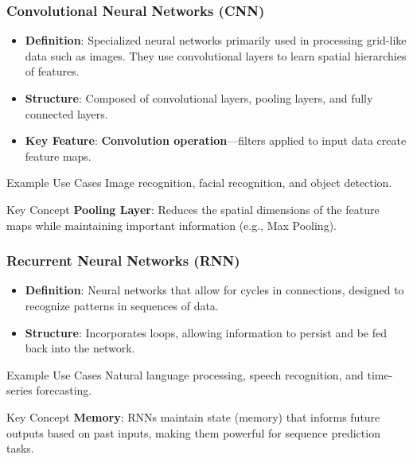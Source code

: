 \documentclass[aspectratio=169]{beamer}
\begin{document}
\begin{frame}[fragile]
    \frametitle{Convolutional Neural Networks (CNN)}
    \begin{itemize}
        \item \textbf{Definition}: Specialized neural networks primarily used in processing grid-like data such as images. They use convolutional layers to learn spatial hierarchies of features.
        \item \textbf{Structure}: Composed of convolutional layers, pooling layers, and fully connected layers.
        \item \textbf{Key Feature}: \textbf{Convolution operation}—filters applied to input data create feature maps.
    \end{itemize}

    \begin{block}{Example Use Cases}
        Image recognition, facial recognition, and object detection.
    \end{block}

    \begin{block}{Key Concept}
        \textbf{Pooling Layer}: Reduces the spatial dimensions of the feature maps while maintaining important information (e.g., Max Pooling).
    \end{block}

\end{frame}

\begin{frame}[fragile]
    \frametitle{Recurrent Neural Networks (RNN)}
    \begin{itemize}
        \item \textbf{Definition}: Neural networks that allow for cycles in connections, designed to recognize patterns in sequences of data.
        \item \textbf{Structure}: Incorporates loops, allowing information to persist and be fed back into the network.
    \end{itemize}

    \begin{block}{Example Use Cases}
        Natural language processing, speech recognition, and time-series forecasting.
    \end{block}

    \begin{block}{Key Concept}
        \textbf{Memory}: RNNs maintain state (memory) that informs future outputs based on past inputs, making them powerful for sequence prediction tasks.
    \end{block}
\end{frame}
\end{document}
